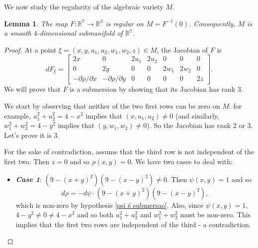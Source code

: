 \documentclass[11pt,reqno]{amsart}
\theoremstyle{plain}
\newtheorem{lemma}[theorem]{Lemma}
\theoremstyle{definition}
\theoremstyle{remark}
\theoremstyle{plain}
\numberwithin{equation}{section}
\newcommand{\R}{\mathbb{R}}
\begin{document}
							We now study the regularity of the algebraic variety $M$.
							
							\begin{lemma} \label{lemma: M eh variedade pra psi}
								The map $F\colon \R^{7}\to \R^{3}$ is regular on $M=F^{-1}(0)$. Consequently, \(M\) is a smooth \(4\)-dimensional submanifold of \(\R^7\).
							\end{lemma}\begin{proof}
								At a point $\xi=(x,y,u_{1},u_{2},w_{1},w_{2},z)\in M$, the Jacobian of $F$ is $$dF_{\xi}=\begin{bmatrix}
									2x&0&2u_{1}&2u_{2}&0&0&0\\
									0&2y&0&0&2w_{1}&2w_{2}&0\\
									-\partial \rho/\partial x&-\partial \rho/\partial y&0&0&0&0&2z
								\end{bmatrix}.$$ We will prove that $F$ is a submersion by showing that its Jacobian has rank $3$.
								
								We start by observing that neither of the two first rows can be zero on $M$: for example, $u_{1}^{2}+u_{2}^{2}=4-x^{2}$ implies that $(x,u_{1},u_{2})\neq 0$ (and similarly, $w_{1}^{2}+w_{2}^{2}=4-y^{2}$ implies that $(y,w_{1},w_{2})\neq 0$). So the Jacobian has rank 2 or 3. Let's prove it is 3. 
								
								For the sake of contradiction, assume that the third row is not independent of the first two. Then $z=0$ and so $\rho(x,y)=0$. We have two cases to deal with:
								
								\begin{itemize}   
									\item \textit{\textbf{Case 1}}: $(9-(x+y)^{2})(9-(x-y)^{2})\neq 0$. Then $\psi(x,y)=1$ and so 
									$$d\rho=-d\psi\cdot (9-(x+y)^{2})(9-(x-y)^{2}),$$
									which is non-zero by hypothesis \ref{psi é submersao}. Also, since $\psi(x,y)=1$, $4-y^{2}\neq0\neq 4-x^{2}$ and so both $u_{1}^{2}+u_{2}^{2}$ and $w_{1}^{2}+w_{2}^{2}$ must be non-zero. This implies that the first two rows are independent of the third - a contradiction.
									
									
									
						
									

\end{itemize}
\end{proof}
\end{document}
